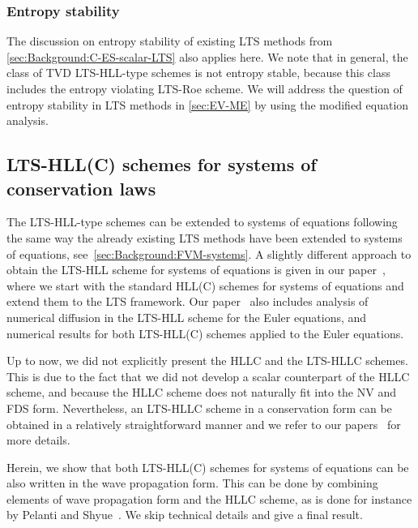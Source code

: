 \subsubsection*{Entropy stability}

The discussion on entropy stability of existing LTS methods from \cref{sec:Background:C-ES-scalar-LTS} also applies here. We note that in general, the class of TVD LTS-HLL-type schemes is not entropy stable, because this class includes the entropy violating LTS-Roe scheme. We will address the question of entropy stability in LTS methods in \cref{sec:EV-ME} by using the modified equation analysis.

\subsection{LTS-HLL(C) schemes for systems of conservation laws}

The LTS-HLL-type schemes can be extended to systems of equations following the same way the already existing LTS methods have been extended to systems of equations, see~\cref{sec:Background:FVM-systems}. A slightly different approach to obtain the LTS-HLL scheme for systems of equations is given in our paper~\cite{jp2}, where we start with the standard HLL(C) schemes for systems of equations and extend them to the LTS framework. Our paper~\cite{jp2} also includes analysis of numerical diffusion in the LTS-HLL scheme for the Euler equations, and numerical results for both LTS-HLL(C) schemes applied to the Euler equations.

Up to now, we did not explicitly present the HLLC and the LTS-HLLC schemes. This is due to the fact that we did not develop a scalar counterpart of the HLLC scheme, and because the HLLC scheme does not naturally fit into the NV and FDS form. Nevertheless, an LTS-HLLC scheme in a conservation form can be obtained in a relatively straightforward manner and we refer to our papers~\cite{cp2,jp2} for more details.

Herein, we show that both LTS-HLL(C) schemes for systems of equations can be also written in the wave propagation form. This can be done by combining elements of wave propagation form and the HLLC scheme, as is done for instance by Pelanti and Shyue~\cite{pel14}. We skip technical details and give a final result.

